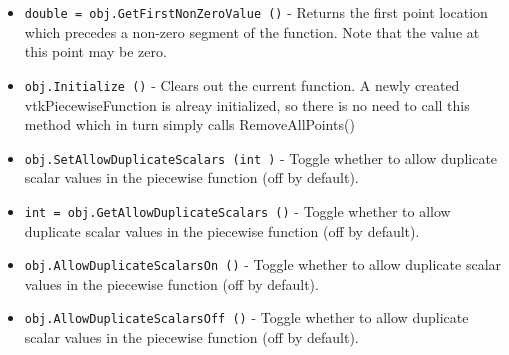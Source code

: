 \begin{itemize}
\item  \verb|double = obj.GetFirstNonZeroValue ()| -  Returns the first point location which precedes a non-zero segment of the
 function. Note that the value at this point may be zero.

\item  \verb|obj.Initialize ()| -  Clears out the current function. A newly created vtkPiecewiseFunction
 is alreay initialized, so there is no need to call this method which
 in turn simply calls RemoveAllPoints() 

\item  \verb|obj.SetAllowDuplicateScalars (int )| -  Toggle whether to allow duplicate scalar values in the piecewise
 function (off by default).

\item  \verb|int = obj.GetAllowDuplicateScalars ()| -  Toggle whether to allow duplicate scalar values in the piecewise
 function (off by default).

\item  \verb|obj.AllowDuplicateScalarsOn ()| -  Toggle whether to allow duplicate scalar values in the piecewise
 function (off by default).

\item  \verb|obj.AllowDuplicateScalarsOff ()| -  Toggle whether to allow duplicate scalar values in the piecewise
 function (off by default).

\end{itemize}
